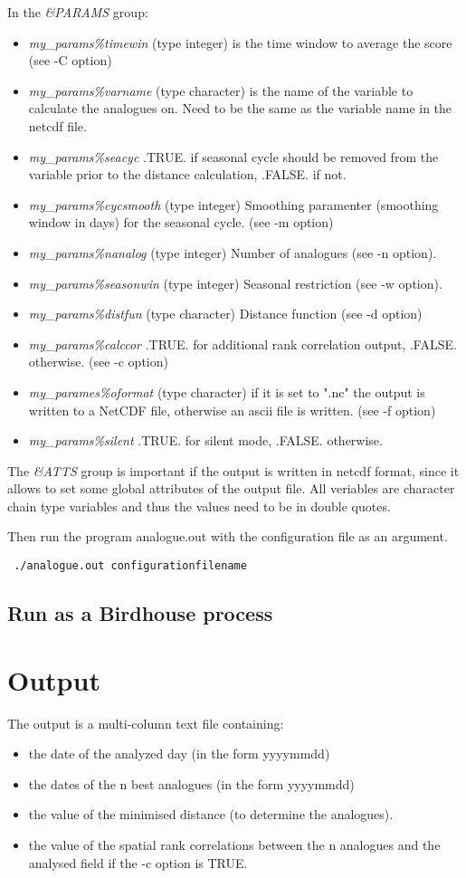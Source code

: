 \documentclass[11p,a4paper]{article}
\begin{document}
In the \textit{\&PARAMS} group:
\begin{itemize}
 \item \textit{my\_params\%timewin} (type integer) is the time window to average the score (see -C option)
 \item \textit{my\_params\%varname} (type character) is the name of the  variable  to calculate the analogues on. Need to be the same as the variable name in the netcdf file.
 \item \textit{my\_params\%seacyc} .TRUE. if seasonal cycle should be removed from the variable prior to the distance calculation, .FALSE. if not.
 \item \textit{my\_params\%cycsmooth} (type integer) Smoothing paramenter (smoothing window in days) for the seasonal cycle. (see -m option)
 \item \textit{my\_params\%nanalog} (type integer) Number of analogues (see -n option).
 \item \textit{my\_params\%seasonwin} (type integer) Seasonal restriction (see -w option).
 \item \textit{my\_params\%distfun} (type character) Distance function (see -d option)
 \item \textit{my\_params\%calccor} .TRUE. for additional rank correlation output, .FALSE. otherwise. (see -c option)
 \item \textit{my\_parames\%oformat} (type character) if it is set to ".nc" the output is written to a NetCDF file, otherwise an ascii file is written. (see -f option)
 \item \textit{my\_params\%silent} .TRUE. for silent mode, .FALSE. otherwise.
\end{itemize}

The \textit{\&ATTS} group is important if the output is written in netcdf format, since it allows to set some global attributes of the output file. All veriables are character chain type variables and thus the values need to be in double quotes.

Then run the program analogue.out with the configuration file as an argument.
\begin{verbatim}
 ./analogue.out configurationfilename
\end{verbatim}
\subsection{Run as a Birdhouse process}

\section{Output}
The output is a multi-column text file containing:
\begin{itemize}
 \item the date of the analyzed day (in the form yyyymmdd)
 \item the dates of the n best analogues (in the form yyyymmdd)
 \item the value of the minimised distance (to determine the analogues). 
 \item the value of the spatial rank correlations between the n analogues and the analysed field if the -c option is TRUE.
\end{itemize}
\end{document}
